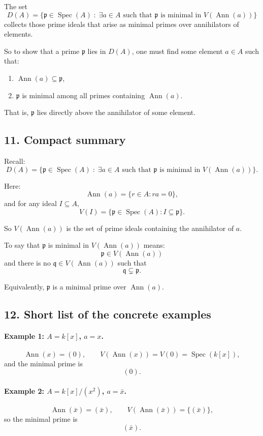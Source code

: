 \documentclass[12pt,a4paper]{article}
\theoremstyle{notespace}
\DeclareMathOperator{\Spec}{Spec}
\DeclareMathOperator{\Ann}{Ann}
\begin{document}
The set
\[
D(A)=\{\mathfrak p\in \Spec(A)\;:\;\exists a\in A \text{ such that }
\mathfrak p \text{ is minimal in } V(\Ann(a))\}
\]
collects those prime ideals that arise as minimal primes over annihilators of elements.

So to show that a prime \(\mathfrak p\) lies in \(D(A)\), one must find some element \(a\in A\) such that:

\begin{enumerate}
	\item \(\Ann(a)\subseteq \mathfrak p\),
	\item \(\mathfrak p\) is minimal among all primes containing \(\Ann(a)\).
\end{enumerate}

That is, \(\mathfrak p\) lies directly above the annihilator of some element.

\subsection{11. Compact summary}

Recall:
\[
D(A)=\{\mathfrak p\in \Spec(A)\;:\;\exists a\in A \text{ such that }
\mathfrak p \text{ is minimal in } V(\Ann(a))\}.
\]

Here:
\[
\Ann(a)=\{r\in A:ra=0\},
\]
and for any ideal \(I\subseteq A\),
\[
V(I)=\{\mathfrak p\in \Spec(A): I\subseteq \mathfrak p\}.
\]

So \(V(\Ann(a))\) is the set of prime ideals containing the annihilator of \(a\).

To say that \(\mathfrak p\) is minimal in \(V(\Ann(a))\) means:
\[
\mathfrak p\in V(\Ann(a))
\]
and there is no \(\mathfrak q\in V(\Ann(a))\) such that
\[
\mathfrak q\subsetneq \mathfrak p.
\]

Equivalently, \(\mathfrak p\) is a minimal prime over \(\Ann(a)\).

\subsection{12. Short list of the concrete examples}

\paragraph{Example 1: \(A=k[x]\), \(a=x\).}
\[
\Ann(x)=(0), \qquad V(\Ann(x))=V(0)=\Spec(k[x]),
\]
and the minimal prime is
\[
(0).
\]

\paragraph{Example 2: \(A=k[x]/(x^2)\), \(a=\bar x\).}
\[
\Ann(\bar x)=(\bar x), \qquad V(\Ann(\bar x))=\{(\bar x)\},
\]
so the minimal prime is
\[
(\bar x).
\]
\end{document}
